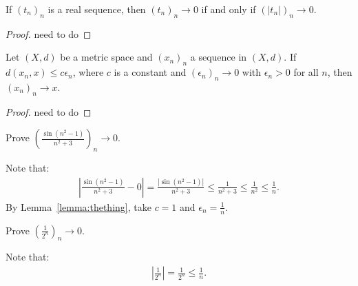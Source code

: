     \begin{lemma}
        If $(t_n)_n$ is a real sequence, then $(t_n)_n \rightarrow 0$ if and only if $(|t_n|)_n \rightarrow 0$.
    \end{lemma}
        \begin{proof}
            {\color{red} need to do}
        \end{proof}

    \begin{lemma}\label{lemma:thething}
        Let $(X,d)$ be a metric space and $(x_n)_n$ a sequence in $(X,d)$. If $d(x_n,x) \leq c\epsilon_n$, where $c$ is a constant and $(\epsilon_n)_n \rightarrow 0$ with $\epsilon_n > 0$ for all $n$, then $(x_n)_n \rightarrow x$.
    \end{lemma}
        \begin{proof}
        {\color{red} need to do}
        \end{proof}

    \begin{example}
        Prove $\left(\frac{\sin(n^2 - 1)}{n^2 + 3}\right)_n \rightarrow 0$.
    \end{example}
        \begin{solution}
            Note that:
                \begin{equation*}
                \begin{split}
                \left|\frac{\sin(n^2 - 1)}{n^2 + 3} - 0 \right|
                 = \frac{|\sin(n^2 - 1)|}{n^2 + 3} 
                 \leq \frac{1}{n^2 + 3} 
                 \leq \frac{1}{n^2} 
                 \leq \frac{1}{n}.
                \end{split}
                \end{equation*}
            By Lemma~\ref{lemma:thething}, take $c=1$ and $\epsilon_n = \frac{1}{n}$.
        \end{solution}

    \begin{example}
        Prove $\left(\frac{1}{2^n}\right)_n \rightarrow 0$.
    \end{example}
        \begin{solution}
            Note that:
                \begin{equation*}
                \begin{split}
                    \left|\frac{1}{2^n}\right| = \frac{1}{2^n} \leq \frac{1}{n}.
                \end{split}
                \end{equation*}
        \end{solution}
    
